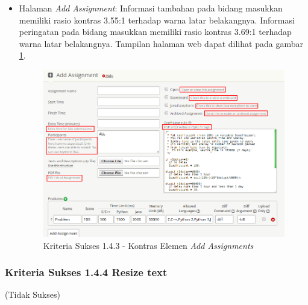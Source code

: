 \documentclass[a4paper,twoside]{article}
\begin{document}
\begin{enumerate}
\begin{itemize}
			\item Halaman \textit{Add Assignment}: Informasi tambahan pada bidang masukkan memiliki rasio kontras 3.55:1 terhadap warna latar belakangnya. Informasi peringatan pada bidang masukkan memiliki rasio kontras 3.69:1 terhadap warna latar belakangnya. Tampilan halaman web dapat dilihat pada gambar \ref{fig:kepatuhan_1_4_3_add_assignment}.
			\begin{figure}[H]
				\centering  
				\includegraphics[scale=0.5]{kepatuhan_1_4_3_add_assignment}  
				\caption[Kriteria Sukses 1.4.3 - Kontras Elemen \textit{Add Assignments}]{Kriteria Sukses 1.4.3 - Kontras Elemen \textit{Add Assignments}} 
				\label{fig:kepatuhan_1_4_3_add_assignment} 
			\end{figure}
			
		\end{itemize}
		
		\pagebreak
		
		\subsubsection*{Kriteria Sukses 1.4.4 Resize text}
		\label{subsubsec:kepatuhan_kriteria_1.4.4}
		(Tidak Sukses) \\
		

\end{enumerate}
\end{document}
